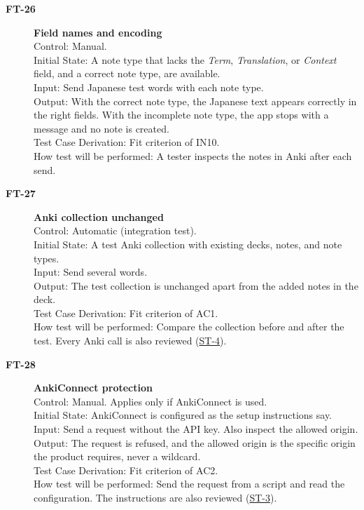 \documentclass[12pt, titlepage]{article}
\newcommand{\tid}[1]{\hypertarget{test:#1}{\textbf{#1}}}
\newcommand{\tref}[1]{\hyperlink{test:#1}{#1}}
\begin{document}
\begin{description}
\item[\tid{FT-26}] \textbf{Field names and encoding}\\
Control: Manual.\\
Initial State: A note type that lacks the \emph{Term}, \emph{Translation}, or
\emph{Context} field, and a correct note type, are available.\\
Input: Send Japanese test words with each note type.\\
Output: With the correct note type, the Japanese text appears correctly in the
right fields. With the incomplete note type, the app stops with a message and no
note is created.\\
Test Case Derivation: Fit criterion of IN10.\\
How test will be performed: A tester inspects the notes in Anki after each send.

\item[\tid{FT-27}] \textbf{Anki collection unchanged}\\
Control: Automatic (integration test).\\
Initial State: A test Anki collection with existing decks, notes, and note
types.\\
Input: Send several words.\\
Output: The test collection is unchanged apart from the added notes in the
\progname{} deck.\\
Test Case Derivation: Fit criterion of AC1.\\
How test will be performed: Compare the collection before and after the test.
Every Anki call is also reviewed (\tref{ST-4}).

\item[\tid{FT-28}] \textbf{AnkiConnect protection}\\
Control: Manual. Applies only if AnkiConnect is used.\\
Initial State: AnkiConnect is configured as the setup instructions say.\\
Input: Send a request without the API key. Also inspect the allowed origin.\\
Output: The request is refused, and the allowed origin is the specific origin the
product requires, never a wildcard.\\
Test Case Derivation: Fit criterion of AC2.\\
How test will be performed: Send the request from a script and read the
configuration. The instructions are also reviewed (\tref{ST-3}).


\end{description}
\end{document}
